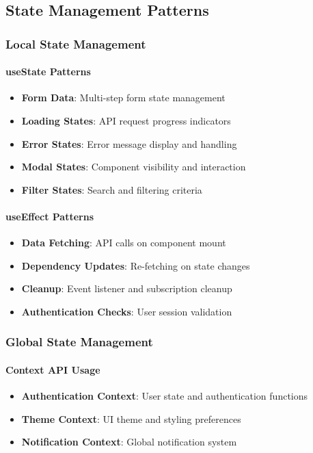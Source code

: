 \documentclass[12pt,a4paper]{article}
\begin{document}
\subsection{State Management Patterns}
\label{subsec:state-management}

\subsubsection{Local State Management}
\label{subsubsec:local-state}

\paragraph{useState Patterns}
\begin{itemize}
\item \textbf{Form Data}: Multi-step form state management
\item \textbf{Loading States}: API request progress indicators
\item \textbf{Error States}: Error message display and handling
\item \textbf{Modal States}: Component visibility and interaction
\item \textbf{Filter States}: Search and filtering criteria
\end{itemize}

\paragraph{useEffect Patterns}
\begin{itemize}
\item \textbf{Data Fetching}: API calls on component mount
\item \textbf{Dependency Updates}: Re-fetching on state changes
\item \textbf{Cleanup}: Event listener and subscription cleanup
\item \textbf{Authentication Checks}: User session validation
\end{itemize}

\subsubsection{Global State Management}
\label{subsubsec:global-state}

\paragraph{Context API Usage}
\begin{itemize}
\item \textbf{Authentication Context}: User state and authentication functions
\item \textbf{Theme Context}: UI theme and styling preferences
\item \textbf{Notification Context}: Global notification system
\end{itemize}
\end{document}
